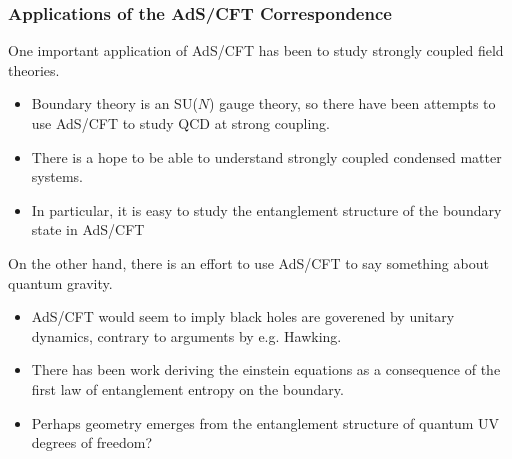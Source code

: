 \documentclass[8pt,aspectratio=169]{beamer}
\begin{document}
\begin{frame}
\frametitle{Applications of the AdS/CFT Correspondence}

One important application of AdS/CFT has been to study strongly coupled  field theories.

\begin{itemize}

\item Boundary theory is an SU($N$) gauge theory, so there have been attempts to use AdS/CFT to study QCD at strong coupling.

\item There is a hope to be able to understand strongly coupled condensed matter systems. 

\item In particular, it is easy to study the entanglement structure of the boundary state in AdS/CFT

\end{itemize}

On the other hand, there is an effort to use AdS/CFT to say something about quantum gravity.

\begin{itemize}

\item AdS/CFT would seem to imply black holes are goverened by unitary dynamics, contrary to arguments by e.g. Hawking.

\item There has been work deriving the einstein equations as a consequence of the first law of entanglement entropy on the boundary. 

\item Perhaps geometry emerges from the entanglement structure of quantum UV degrees of freedom?

\end{itemize}

\end{frame}
\end{document}
